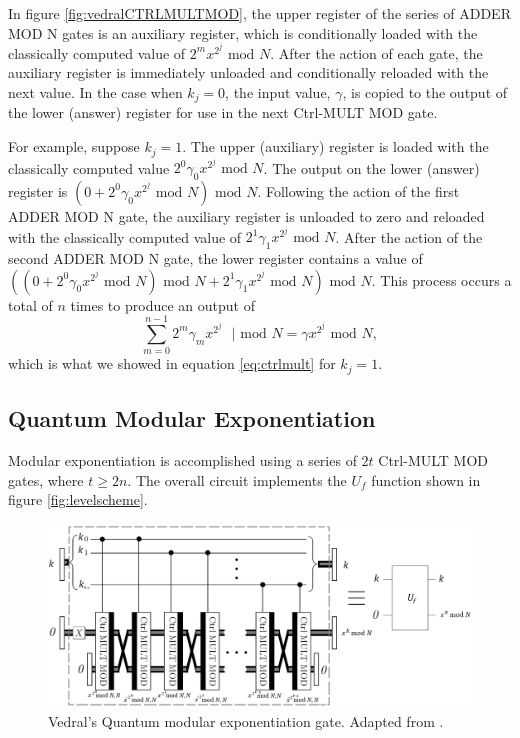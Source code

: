 \documentclass{article}
\begin{document}
In figure \ref{fig:vedralCTRLMULTMOD}, the upper register of the series of ADDER MOD N gates is an auxiliary register, which is conditionally loaded with the classically computed value of $2^m x^{2^j} \text{ mod } N$. After the action of each gate, the auxiliary register is immediately unloaded and conditionally reloaded with the next value. In the case when $k_j = 0$, the input value, $\gamma$, is copied to the output of the lower (answer) register for use in the next Ctrl-MULT MOD gate.

For example, suppose $k_j = 1$. The upper (auxiliary) register is loaded with the classically computed value $2^0\gamma_0x^{2^j} \text{ mod }N$. The output on the lower (answer) register is $(0 + 2^0\gamma_0x^{2^j} \text{ mod }N) \text{ mod } N$. Following the action of the first ADDER MOD N gate, the auxiliary register is unloaded to zero and reloaded with the classically computed value of $2^1\gamma_1x^{2^j} \text{ mod }N$. After the action of the second ADDER MOD N gate, the lower register contains a value of $\left((0 + 2^0\gamma_0x^{2^j} \text{ mod }N) \text{ mod } N + 2^1\gamma_1x^{2^j} \text{ mod } N\right) \text{ mod }N$. This process occurs a total of $n$ times to produce an output of 
\begin{equation*}
\sum_{m=0}^{n-1}2^m \gamma_m x^{2^j} \text {  }|\text{  mod }N = \gamma x^{2^j} \text{ mod } N,
\end{equation*}
which is what we showed in equation \eqref{eq:ctrlmult} for $k_j = 1$.


\subsection{Quantum Modular Exponentiation}
Modular exponentiation is accomplished using a series of $2t$ Ctrl-MULT MOD gates, where $t\geq 2n$. The overall circuit implements the $U_f$ function shown in figure \ref{fig:levelscheme}.
\pagebreak
\begin{figure}[!htbp]
\centering
\includegraphics[width=1\textwidth]
{vedralexpmod.png}
\captionsetup{format = hang}
\caption{Vedral's Quantum modular exponentiation gate. Adapted from \cite{VBE95}.}
\label{fig:vedralexpmod}
\end{figure}
\end{document}
